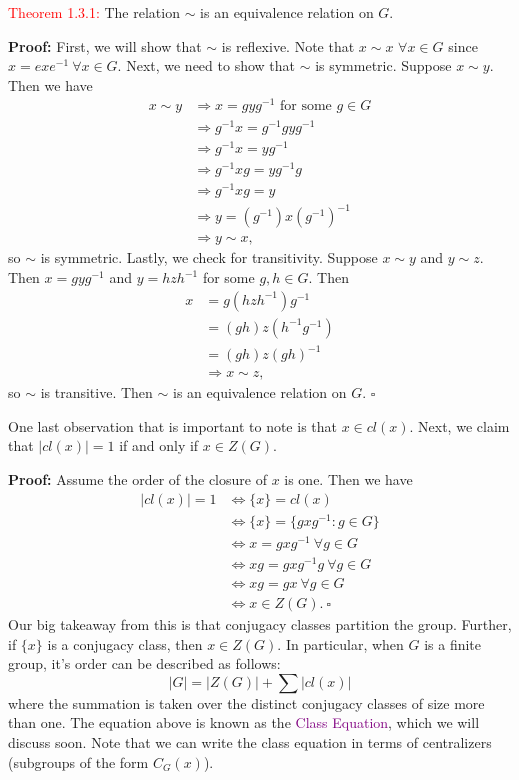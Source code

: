 \documentclass{article}
\begin{document}
\textcolor{red}{Theorem 1.3.1:} The relation $\sim$ is an equivalence relation on $G$.

\textbf{Proof:} First, we will show that $\sim$ is reflexive. Note that $x \sim x$ $\forall x \in G$ since $x = exe^{-1} \ \forall x \in G$. 
Next, we need to show that $\sim$ is symmetric. 
Suppose $x \sim y$. Then we have
\begin{align*}
    x \sim y &\Longrightarrow x = gyg^{-1} \text{ for some } g \in G \\
    &\Longrightarrow g^{-1}x = g^{-1}gyg^{-1} \\
    &\Longrightarrow g^{-1}x = yg^{-1} \\
    &\Longrightarrow g^{-1}xg = yg^{-1}g \\
    &\Longrightarrow g^{-1}xg = y \\
    &\Longrightarrow y = (g^{-1})x(g^{-1})^{-1} \\
    &\Longrightarrow y \sim x,
\end{align*}
so $\sim$ is symmetric. Lastly, we check for transitivity. Suppose $x \sim y$ and $y \sim z$. Then $x = gyg^{-1}$ and $y = hzh^{-1}$ for 
some $g,h \in G$. Then
\begin{align*}
    x &= g(hzh^{-1})g^{-1} \\
    &= (gh)z(h^{-1}g^{-1}) \\
    &= (gh)z(gh)^{-1} \\
    &\Longrightarrow x \sim z,
\end{align*}
so $\sim$ is transitive. Then $\sim$ is an equivalence relation on $G$. $\square$

One last observation that is important to note is that $x \in cl(x)$. Next, we claim that $|cl(x)| = 1$ if and only if $x \in Z(G)$. 

\textbf{Proof:} Assume the order of the closure of $x$ is one. Then we have
\begin{align*}
    |cl(x)|=1 &\Longleftrightarrow \{x\} = cl(x) \\
    &\Longleftrightarrow \{x\} = \{gxg^{-1}:g \in G\} \\
    &\Longleftrightarrow x = gxg^{-1} \ \forall g \in G \\
    &\Longleftrightarrow xg = gxg^{-1}g \ \forall g \in G \\
    &\Longleftrightarrow xg = gx \ \forall g \in G \\
    &\Longleftrightarrow x \in Z(G). \ \square 
\end{align*}
Our big takeaway from this is that conjugacy classes partition the group. Further, if $\{x\}$ is a conjugacy class, then $x \in Z(G)$. In 
particular, when $G$ is a finite group, it's order can be described as follows:
\[
    |G| = |Z(G)| + \sum{|cl(x)|}
\]
where the summation is taken over the distinct conjugacy classes of size more than one. The equation above is known as the 
\textcolor{purple}{Class Equation}, which we will discuss soon. Note that we can write the class equation in terms of centralizers 
(subgroups of the form $C_G(x)$).
\end{document}
